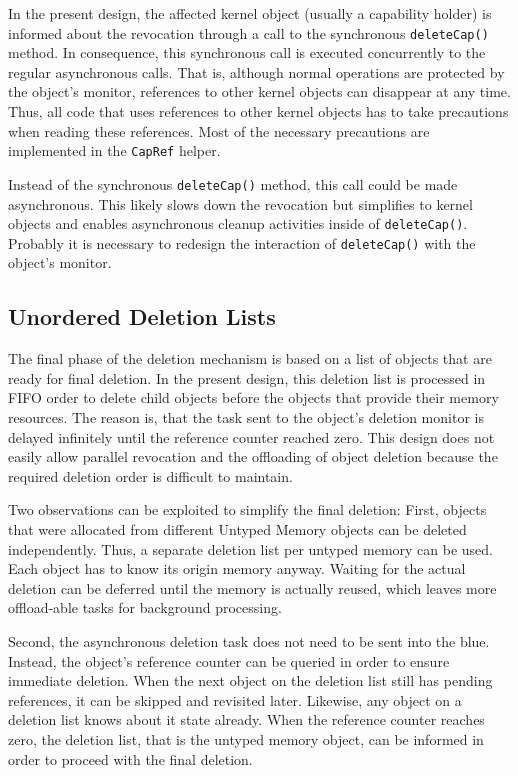 In the present design, the affected kernel object (usually a capability holder) is informed about the revocation through a call to the synchronous \texttt{deleteCap()} method. In consequence, this synchronous call is executed concurrently to the regular asynchronous calls. That is, although normal operations are protected by the object's monitor, references to other kernel objects can disappear at any time. Thus, all code that uses references to other kernel objects has to take precautions when reading these references. Most of the necessary precautions are implemented in the \texttt{CapRef} helper. 

Instead of the synchronous \texttt{deleteCap()} method, this call could be made asynchronous. This likely slows down the revocation but simplifies to kernel objects and enables asynchronous cleanup activities inside of \texttt{deleteCap()}. Probably it is necessary to redesign the interaction of \texttt{deleteCap()} with the object's monitor.

\subsection{Unordered Deletion Lists}
The final phase of the deletion mechanism is based on a list of objects that are ready for final deletion. In the present design, this deletion list is processed in FIFO order to delete child objects before the objects that provide their memory resources. The reason is, that the task sent to the object's deletion monitor is delayed infinitely until the reference counter reached zero. This design does not easily allow parallel revocation and the offloading of object deletion because the required deletion order is difficult to maintain.

Two observations can be exploited to simplify the final deletion: First, objects that were allocated from different Untyped Memory objects can be deleted independently. Thus, a separate deletion list per untyped memory can be used. Each object has to know its origin memory anyway. Waiting for the actual deletion can be deferred until the memory is actually reused, which leaves more offload-able tasks for background processing. 

Second, the asynchronous deletion task does not need to be sent into the blue. Instead, the object's reference counter can be queried in order to ensure immediate deletion. When the next object on the deletion list still has pending references, it can be skipped and revisited later. Likewise, any object on a deletion list knows about it state already. When the reference counter reaches zero, the deletion list, that is the untyped memory object, can be informed in order to proceed with the final deletion.

